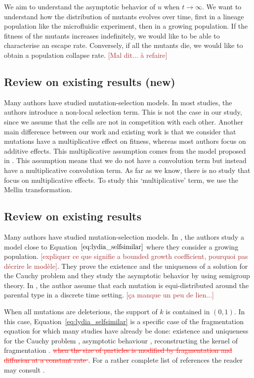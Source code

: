 \documentclass[11pt]{amsart}
\newcommand{\ndr}[1]{\textcolor{brown}{[#1]}}
\newcommand{\guimrem}[1]{\textcolor{red}{\sout{#1}}}
\begin{document}
We aim to understand the asymptotic behavior of $u$ when $t \to \infty$. We want to understand how the distribution of mutants evolves over time, first in a lineage population like the microfluidic experiment, then in a growing population. If the fitness of the mutants increases indefinitely, we would like to be able to characterise an escape rate. Conversely, if all the mutants die, we would like to obtain a population collapse rate. \ndr{Mal dit... à refaire}
    

\subsection{Review on existing results (new)}
Many authors have studied mutation-selection models. 
In most studies, the authors introduce a non-local selection term. This is not the case in our study, since we assume that the cells are not in competition with each other. 
Another main difference between our work and existing work is that we consider that mutations have a multiplicative effect on fitness, whereas most authors focus on additive effects. This multiplicative assumption comes from the model proposed in \cite{robert2018mutation}. This assumption means that we do not have a convolution term but instead have a multiplicative convolution term. As far as we know, there is no study that focus on multiplicative effects. To study this ‘multiplicative’ term, we use the Mellin transformation. 

\subsection{Review on existing results} \mbox{}

Many authors have studied mutation-selection models. 
In \cite{burger1996stationary}, the authors study a model close to Equation~$\eqref{eq:lydia_selfsimilar}$ where they consider a growing population. \ndr{expliquer ce que signifie a bounded growth coefficient, pourquoi pas décrire le modèle}. They prove the existence and the uniqueness of a solution for the Cauchy problem and they study the asymptotic behavior by using semigroup theory.
In \cite{eshel1972evolution}, the author assume that each mutation is equi-distributed around the parental type in a discrete time setting. \ndr{ça manque un peu de lien...}

When all mutations are deleterious, the support of $k$ is contained in $(0,1)$. In this case, Equation~\eqref{eq:lydia_selfsimilar} is a specific case of the fragmentation equation for which many studies have already be done: existence and uniqueness for the Cauchy problem \cite{melzak1957scalar}, asymptotic behaviour \cite{doumic2016time}, reconstructing the kernel of fragmentation \cite{hoang2017estimating,hoang2017nonparametric, doumic2018estimating,doumic2021inverse}. \guimrem{when the size of particles is modified by fragmentation and diffusion at a constant rate \cite{laurenccot2022fragmentation}}. 
For a rather complete list of references the reader may consult \cite{banasiak2019analytic}.\\
\end{document}
